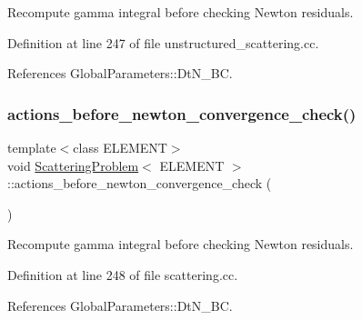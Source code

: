 Recompute gamma integral before checking Newton residuals. 



Definition at line 247 of file unstructured\+\_\+scattering.\+cc.



References Global\+Parameters\+::\+Dt\+N\+\_\+\+BC.

\mbox{\label{classScatteringProblem_ad096c311ee474d23514656d2ba76a4b8}} 
\subsubsection{\texorpdfstring{actions\+\_\+before\+\_\+newton\+\_\+convergence\+\_\+check()}{actions\_before\_newton\_convergence\_check()}\hspace{0.1cm}{\footnotesize\ttfamily [2/2]}}
{\footnotesize\ttfamily template$<$class E\+L\+E\+M\+E\+NT$>$ \\
void \hyperlink{classScatteringProblem}{Scattering\+Problem}$<$ E\+L\+E\+M\+E\+NT $>$\+::actions\+\_\+before\+\_\+newton\+\_\+convergence\+\_\+check (\begin{DoxyParamCaption}{ }\end{DoxyParamCaption})\hspace{0.3cm}{\ttfamily [inline]}}



Recompute gamma integral before checking Newton residuals. 



Definition at line 248 of file scattering.\+cc.



References Global\+Parameters\+::\+Dt\+N\+\_\+\+BC.

\mbox{\label{classScatteringProblem_a91ce14b928ec6edbb9d85515a310b1fb}} 
